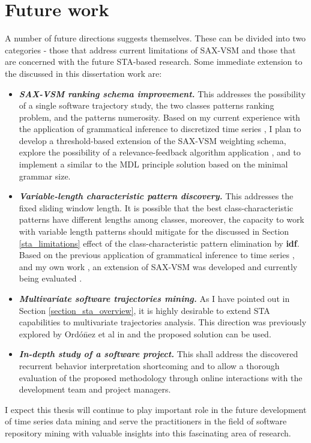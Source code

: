 \section{Future work}\label{section_future_work}
A number of future directions suggests themselves. These can be divided into two categories - those that address current 
limitations of SAX-VSM and those that are concerned with the future STA-based research. Some immediate extension to the 
discussed in this dissertation work are:
\begin{itemize}
 \item \textit{\textbf{SAX-VSM ranking schema improvement.}} This addresses the possibility of a single software trajectory study, 
 the two classes patterns ranking problem, and the patterns numerosity. 
 Based on my current experience with the application of grammatical inference to discretized time series \cite{grammarviz2}, 
 I plan to develop a threshold-based extension of the SAX-VSM weighting schema, 
 explore the possibility of a relevance-feedback algorithm application \cite{intro_ir_Manning}, 
 and to implement a similar to the MDL principle \cite{mdl} solution based on the minimal grammar size.
 \item \textit{\textbf{Variable-length characteristic pattern discovery.}} This addresses the fixed sliding window length. 
 It is possible that the best class-characteristic patterns have different lengths among classes, moreover, the capacity to 
 work with variable length patterns should mitigate for the discussed in Section \ref{sta_limitations} effect of the class-characteristic pattern elimination by \textbf{idf}. Based on the previous application of grammatical inference to time series \cite{grammarviz}, and my own work \cite{grammarviz2}, an extension of SAX-VSM was developed and currently being evaluated \cite{saxvsm2}.
 \item \textit{\textbf{Multivariate software trajectories mining.}} As I have pointed out in Section \ref{section_sta_overview}, 
 it is highly desirable to extend STA capabilities to multivariate trajectories analysis. This direction was previously explored 
 by  Ord\'{o}\={n}ez et al in \cite{oates1, oates2} and the proposed solution can be used.
 \item \textit{\textbf{In-depth study of a software project.}} This shall address the discovered recurrent behavior
 interpretation shortcoming and to allow a thorough evaluation of the proposed methodology through online interactions with the development team and project managers. 
\end{itemize}

I expect this thesis will continue to play important role in the future development of time series data mining and serve the practitioners in the field of software repository mining with valuable insights into this fascinating area of research.
